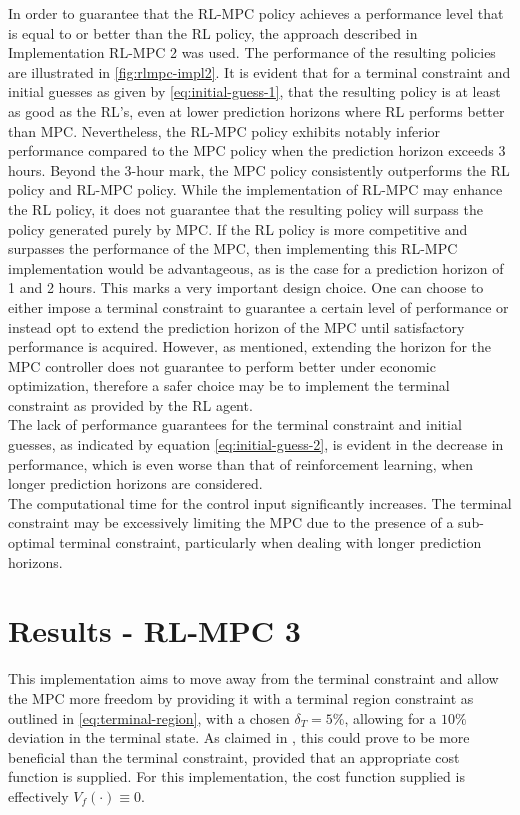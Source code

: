 In order to guarantee that the RL-MPC policy achieves a performance level that is equal to or better than the RL policy, the approach described in Implementation RL-MPC 2 was used.  The performance of the resulting policies are illustrated in \autoref{fig:rlmpc-impl2}. It is evident that for a terminal constraint and initial guesses as given by \autoref{eq:initial-guess-1}, that the resulting policy is at least as good as the RL's, even at lower prediction horizons where RL performs better than MPC. Nevertheless, the RL-MPC policy exhibits notably inferior performance compared to the MPC policy when the prediction horizon exceeds 3 hours. Beyond the 3-hour mark, the MPC policy consistently outperforms the RL policy and RL-MPC policy.  While the implementation of RL-MPC may enhance the RL policy, it does not guarantee that the resulting policy will surpass the policy generated purely by MPC. If the RL policy is more competitive and surpasses the performance of the MPC, then implementing this RL-MPC implementation would be advantageous, as is the case for a prediction horizon of 1 and 2 hours. This marks a very important design choice. One can choose to either impose a terminal constraint to guarantee a certain level of performance or instead opt to extend the prediction horizon of the MPC until satisfactory performance is acquired. However, as mentioned, extending the horizon for the MPC controller does not guarantee to perform better under economic optimization, therefore a safer choice may be to implement the terminal constraint as provided by the RL agent.
\\
The lack of performance guarantees for the terminal constraint and initial guesses, as indicated by equation \autoref{eq:initial-guess-2}, is evident in the decrease in performance, which is even worse than that of reinforcement learning, when longer prediction horizons are considered.\\

The computational time for the control input significantly increases. The terminal constraint may be excessively limiting the MPC due to the presence of a sub-optimal terminal constraint, particularly when dealing with longer prediction horizons.

\section{Results - RL-MPC 3}
This implementation aims to move away from the terminal constraint and allow the MPC more freedom by providing it with a terminal region constraint as outlined in \autoref{eq:terminal-region}, with a chosen $\delta_T = 5\%$, allowing for a $10\%$ deviation in the terminal state. As claimed in \cite{amritEconomicOptimizationUsing2011}, this could prove to be more beneficial than the terminal constraint, provided that an appropriate cost function is supplied. For this implementation, the cost function supplied is effectively $V_f(\cdot) \equiv 0$. 



